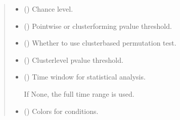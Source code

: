 \documentclass[letterpaper,10pt,english]{sphinxhowto}
\begin{document}
\begin{fulllineitems}
\begin{quote}
\begin{description}
\begin{itemize}
\item {} 
\sphinxAtStartPar
{} (\sphinxstyleliteralemphasis{\sphinxupquote{, }}) \textendash{} Chance level.

\item {} 
\sphinxAtStartPar
{} (\sphinxstyleliteralemphasis{\sphinxupquote{, }}) \textendash{} Point\sphinxhyphen{}wise or cluster\sphinxhyphen{}forming p\sphinxhyphen{}value threshold.

\item {} 
\sphinxAtStartPar
{} (\sphinxstyleliteralemphasis{\sphinxupquote{, }}) \textendash{} Whether to use cluster\sphinxhyphen{}based permutation test.

\item {} 
\sphinxAtStartPar
{} (\sphinxstyleliteralemphasis{\sphinxupquote{, }}) \textendash{} Cluster\sphinxhyphen{}level p\sphinxhyphen{}value threshold.

\item {} 
\sphinxAtStartPar
{} (\sphinxstyleliteralemphasis{\sphinxupquote{, }}) \textendash{} 
\sphinxAtStartPar
Time window for statistical analysis.

\sphinxAtStartPar
If None, the full time range is used.


\item {} 
\sphinxAtStartPar
{} (\sphinxstyleliteralemphasis{\sphinxupquote{, }}) \textendash{} 
\sphinxAtStartPar
Colors for conditions.


\end{itemize}
\end{description}
\end{quote}
\end{fulllineitems}
\end{document}

